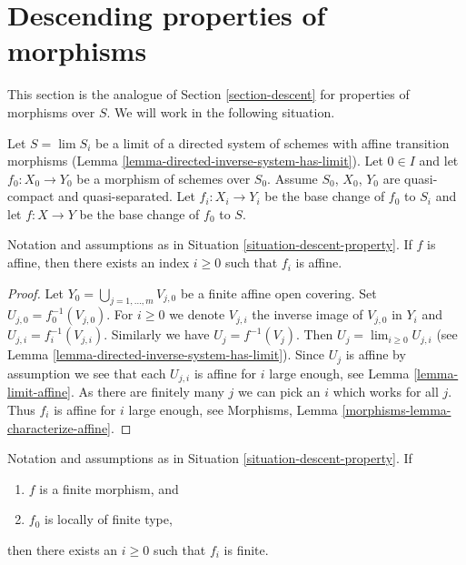 \section{Descending properties of morphisms}
\label{section-descent-of-properties}

\noindent
This section is the analogue of
Section \ref{section-descent}
for properties of morphisms over $S$.
We will work in the following situation.

\begin{situation}
\label{situation-descent-property}
Let $S = \lim S_i$ be a limit of a directed system of schemes
with affine transition morphisms
(Lemma \ref{lemma-directed-inverse-system-has-limit}).
Let $0 \in I$ and let $f_0 : X_0 \to Y_0$ be a morphism of schemes over $S_0$.
Assume $S_0$, $X_0$, $Y_0$ are quasi-compact and quasi-separated.
Let $f_i : X_i \to Y_i$ be the base change of $f_0$ to $S_i$ and
let $f : X \to Y$ be the base change of $f_0$ to $S$.
\end{situation}

\begin{lemma}
\label{lemma-descend-affine-finite-presentation}
Notation and assumptions as in Situation \ref{situation-descent-property}.
If $f$ is affine, then there exists an index $i \geq 0$
such that $f_i$ is affine.
\end{lemma}

\begin{proof}
Let $Y_0 = \bigcup_{j = 1, \ldots, m} V_{j, 0}$ be a finite affine
open covering. Set $U_{j, 0} = f_0^{-1}(V_{j, 0})$. For $i \geq 0$
we denote $V_{j, i}$ the inverse image of $V_{j, 0}$ in $Y_i$ and
$U_{j, i} = f_i^{-1}(V_{j, i})$. Similarly we have
$U_j = f^{-1}(V_j)$. Then $U_j = \lim_{i \geq 0} U_{j, i}$
(see Lemma \ref{lemma-directed-inverse-system-has-limit}).
Since $U_j$ is affine by assumption we see that
each $U_{j, i}$ is affine for $i$ large enough, see
Lemma \ref{lemma-limit-affine}. As there are finitely many $j$ we
can pick an $i$ which works for all $j$. Thus $f_i$ is
affine for $i$ large enough, see
Morphisms, Lemma \ref{morphisms-lemma-characterize-affine}.
\end{proof}

\begin{lemma}
\label{lemma-descend-finite-finite-presentation}
Notation and assumptions as in Situation \ref{situation-descent-property}.
If
\begin{enumerate}
\item $f$ is a finite morphism, and
\item $f_0$ is locally of finite type,
\end{enumerate}
then there exists an $i \geq 0$ such that $f_i$ is finite.
\end{lemma}

